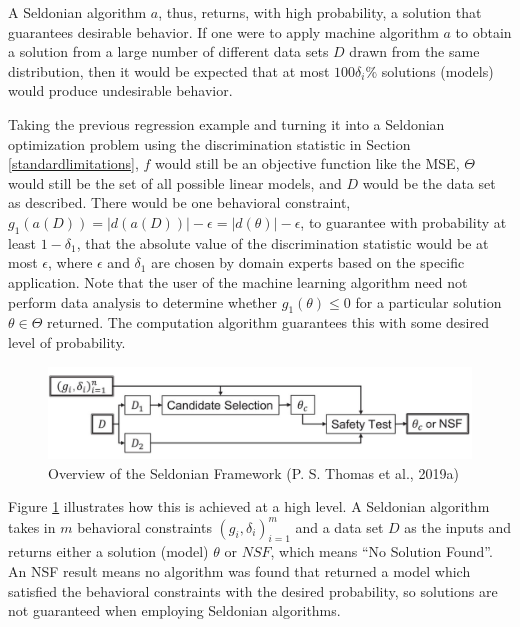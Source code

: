 \documentclass[12pt, twoside]{amherstthesis}
\begin{document}
A Seldonian algorithm \(a\), thus, returns, with high probability, a solution that guarantees desirable behavior. If one were to apply machine algorithm \(a\) to obtain a solution from a large number of different data sets \(D\) drawn from the same distribution, then it would be expected that at most \(100\delta_i \%\) solutions (models) would produce undesirable behavior.

Taking the previous regression example and turning it into a Seldonian optimization problem using the discrimination statistic in Section \ref{standardlimitations}, \(f\) would still be an objective function like the MSE, \(\Theta\) would still be the set of all possible linear models, and \(D\) would be the data set as described. There would be one behavioral constraint, \(g_1(a(D)) = |d(a(D))| - \epsilon = |d(\theta)| - \epsilon\), to guarantee with probability at least \(1-\delta_1\), that the absolute value of the discrimination statistic would be at most \(\epsilon\), where \(\epsilon\) and \(\delta_1\) are chosen by domain experts based on the specific application. Note that the user of the machine learning algorithm need not perform data analysis to determine whether \(g_1(\theta) \leq 0\) for a particular solution \(\theta \in \Theta\) returned. The computation algorithm guarantees this with some desired level of probability.
\begin{figure}

{\centering \includegraphics[width=1\linewidth]{figures/seldonian1} 

}

\caption[Overview of the Seldonian Framework]{Overview of the Seldonian Framework (P. S. Thomas et al., 2019a)}\label{fig:seldonian1}
\end{figure}
Figure \ref{fig:seldonian1} illustrates how this is achieved at a high level. A Seldonian algorithm takes in \(m\) behavioral constraints \((g_i,\delta_i)_{i=1}^m\) and a data set \(D\) as the inputs and returns either a solution (model) \(\theta\) or \(NSF\), which means ``No Solution Found''. An NSF result means no algorithm was found that returned a model which satisfied the behavioral constraints with the desired probability, so solutions are not guaranteed when employing Seldonian algorithms.
\end{document}
